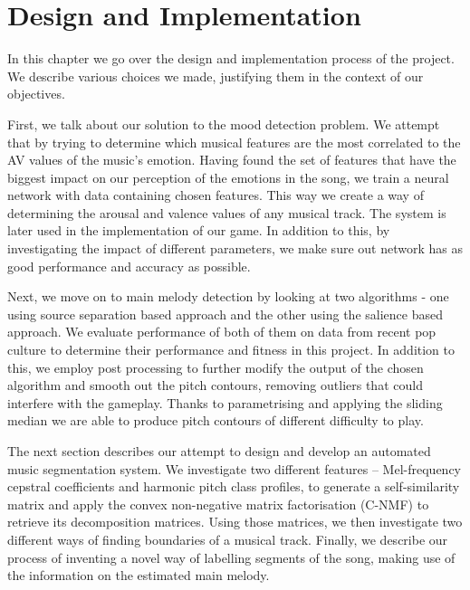 
\chapter{Design and Implementation} 

\label{Chapter5} 

\fancyhead[LE,RO]{\thepage}


In this chapter we go over the design and implementation process of the project. We describe various choices we made, justifying them in the context of our objectives. 

First, we talk about our solution to the mood detection problem. We attempt that by trying to determine which musical features are the most correlated to the AV values of the music's emotion. Having found the set of features that have the biggest impact on our perception of the emotions in the song, we train a neural network with data containing chosen features. This way we create a way of determining the arousal and valence values of any musical track. The system is later used in the implementation of our game. In addition to this, by investigating the impact of different parameters, we make sure out network has as good performance and accuracy as possible.

Next, we move on to main melody detection by looking at two algorithms - one using source separation based approach and the other using the salience based approach. We evaluate performance of both of them on data from recent pop culture to determine their performance and fitness in this project. In addition to this, we employ post processing to further modify the output of the chosen algorithm and smooth out the pitch contours, removing outliers that could interfere with the gameplay. Thanks to parametrising and applying the sliding median we are able to produce pitch contours of different difficulty to play.

The next section describes our attempt to design and develop an automated music segmentation system. We investigate two different features -- Mel-frequency cepstral coefficients and harmonic pitch class profiles, to generate a self-similarity matrix and apply the convex non-negative matrix factorisation (C-NMF) to retrieve its decomposition matrices. Using those matrices, we then investigate two different ways of finding boundaries of a musical track. Finally, we describe our process of inventing a novel way of labelling segments of the song, making use of the information on the estimated main melody.

